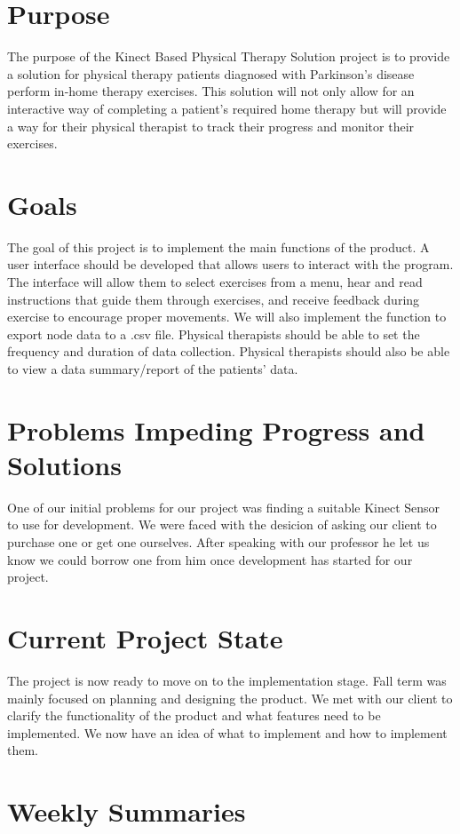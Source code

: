 \documentclass[onecolumn, draftclsnofoot,10pt, compsoc]{IEEEtran}
\begin{document}
\section{Purpose}
The purpose of the Kinect Based Physical Therapy Solution project is to provide a solution for physical therapy patients diagnosed with Parkinson's disease perform in-home therapy exercises. This solution will not only allow for an interactive way of completing a patient's required home therapy but will provide a way for their physical therapist to track their progress and monitor their exercises.

\section{Goals}
The goal of this project is to implement the main functions of the product. A user interface should be developed that allows users to interact with the program. The interface will allow them to select exercises from a menu, hear and read instructions that guide them through exercises, and receive feedback during exercise to encourage proper movements. We will also implement the function to export node data to a .csv file. Physical therapists should be able to set the frequency and duration of data collection. Physical therapists should also be able to view a data summary/report of the patients' data.

\section{Problems Impeding Progress and Solutions}
One of our initial problems for our project was finding a suitable Kinect Sensor to use for development. We were faced with the desicion of asking our client to purchase one or get one ourselves. After speaking with our professor he let us know we could borrow one from him once development has started for our project.

\section{Current Project State}
The project is now ready to move on to the implementation stage. Fall term was mainly focused on planning and designing the product. We met with our client to clarify the functionality of the product and what features need to be implemented. We now have an idea of what to implement and how to implement them.

\section{Weekly Summaries}
\end{document}
